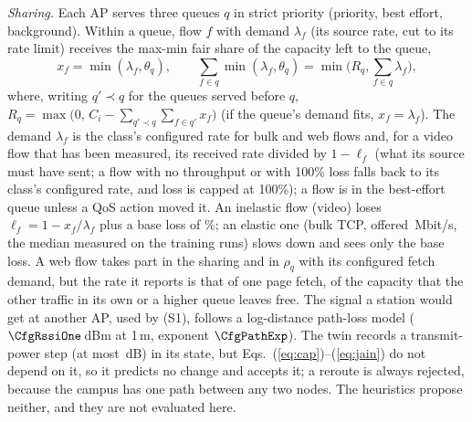 \documentclass[conference]{IEEEtran}
\begin{document}
\emph{Sharing.} Each AP serves three queues $q$ in strict priority (priority, best effort, background). Within a queue, flow $f$ with demand $\lambda_f$ (its source rate, cut to its rate limit) receives the max-min fair share of the capacity left to the queue,
\begin{equation}
x_f=\min(\lambda_f,\theta_q),\qquad \sum_{f\in q}\min(\lambda_f,\theta_q)=\min\Big(R_q,\sum_{f\in q}\lambda_f\Big),
\label{eq:share}
\end{equation}
where, writing $q'\prec q$ for the queues served before $q$, $R_q=\max\big(0,\,C_i-\sum_{q'\prec q}\sum_{f\in q'}x_f\big)$ (if the queue's demand fits, $x_f=\lambda_f$). The demand $\lambda_f$ is the class's configured rate for bulk and web flows and, for a video flow that has been measured, its received rate divided by $1-\ell_f$ (what its source must have sent; a flow with no throughput or with 100\% loss falls back to its class's configured rate, and loss is capped at 100\%); a flow is in the best-effort queue unless a QoS action moved it. An inelastic flow (video) loses $\ell_f=1-x_f/\lambda_f$ plus a base loss of \CfgBaseLoss\%; an elastic one (bulk TCP, offered \CfgBulk\,Mbit/s, the median measured on the training runs) slows down and sees only the base loss. A web flow takes part in the sharing and in $\rho_q$ with its configured fetch demand, but the rate it reports is that of one page fetch, \CfgFetch{} of the capacity that the other traffic in its own or a higher queue leaves free. The signal a station would get at another AP, used by (S1), follows a log-distance path-loss model ($\CfgRssiOne$\,dBm at 1\,m, exponent $\CfgPathExp$). The twin records a transmit-power step (at most \CfgTxStep\,dB) in its state, but Eqs.~(\ref{eq:cap})--(\ref{eq:jain}) do not depend on it, so it predicts no change and accepts it; a reroute is always rejected, because the campus has one path between any two nodes. The heuristics propose neither, and they are not evaluated here.
\end{document}
